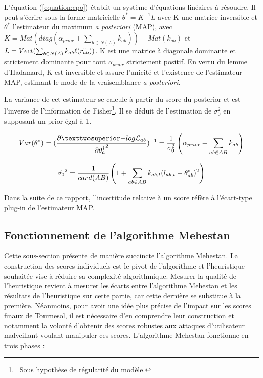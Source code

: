 L'équation (\ref{equation:cpo}) établit un système d'équations linéaires à résoudre. Il peut s'écrire sous la forme matricielle $\theta^*=K^{-1}L$ avec K une matrice inversible et $\theta^*$ l'estimateur du maximum \textit{a posteriori} (MAP), avec $K = Mat(diag(\alpha_{prior}+\sum_{b \in N(A)} k_{ab}))   - Mat(k_{ab}) $
et $L = Vect(\sum_{b \in N(A)} k_{ab}\ell(\Tilde{r_{ab}}))$.
K est une matrice à diagonale dominante et strictement dominante pour tout $\alpha_{prior}$ strictement positif. En vertu du lemme d'Hadamard, K est inversible et assure l'unicité et l'existence de l'estimateur MAP, estimant le mode de la vraisemblance \textit{a posteriori}.

La variance de cet estimateur se calcule à partir du score du posterior et est l'inverse de l'information de Fisher\footnote{~Sous hypothèse de régularité du modèle.}. Il se déduit de l'estimation de $\sigma^2_0$ en supposant un prior égal à 1.

\begin{equation}
Var(\score)= (\frac{\partial²{-log \mathcal{L}_{ab}}}{\partial{\theta^\dagger_a}^2})^{-1}=\frac{1}{\sigma_0^2}\left( \alpha_{prior} + \sum_{ab \in AB} k_{ab} \right)
\end{equation}

\begin{equation}
\hat{\sigma_0}^2 =\frac{1}{card(AB)} \left( 1 + \sum_{ab \in AB} k_{ab,t}(l_{ab,t} - \theta^*_{ab})^2 \right)
\end{equation}

Dans la suite de ce rapport, l'incertitude relative à un score réfère à l'écart-type plug-in de l'estimateur MAP.

\subsection{Fonctionnement de l'algorithme Mehestan}

Cette sous-section présente de manière succincte l'algorithme Mehestan. La construction des scores individuels est le pivot de l'algorithme et l'heuristique souhaitée vise à réduire sa complexité algorithmique. Mesurer la qualité de l'heuristique revient à mesurer les écarts entre l'algorithme Mehestan et les résultats de l'heuristique sur cette partie, car cette dernière se substitue à la première. Néanmoins, pour avoir une idée plus précise de l'impact sur les scores finaux de Tournesol, il est nécessaire d'en comprendre leur construction et notamment la volonté d'obtenir des scores robustes aux attaques d'utilisateur malveillant voulant manipuler ces scores.
L'algorithme Mehestan fonctionne en trois phases :

